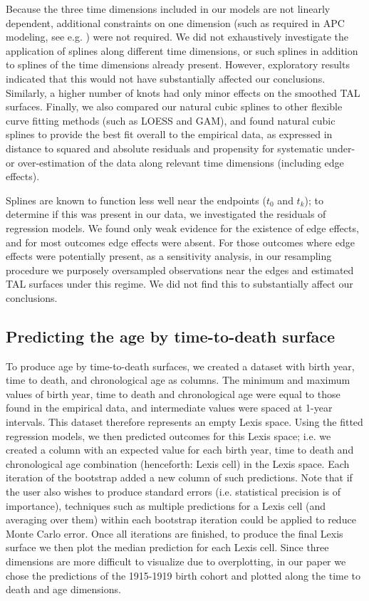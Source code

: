 \documentclass[11pt,oneside,a4paper]{article} %
\begin{document}
\begin{appendices}
Because the three time dimensions included in our models are not linearly
dependent, additional constraints on one dimension (such as required in APC
modeling, see e.g. \citet{clayton1987models}) were not required. We did not exhaustively investigate the application of splines along different time dimensions, or such splines in addition to splines of the time dimensions already present. However, exploratory results indicated that this would not have substantially affected our conclusions. Similarly, a higher number of knots had only minor effects on the smoothed TAL surfaces. Finally, we also compared our natural cubic splines to other flexible curve fitting methods (such as LOESS and GAM), and found natural cubic splines to provide the best fit overall to the empirical data, as expressed in distance to squared and absolute residuals and propensity for systematic under- or over-estimation of the data along relevant time dimensions (including edge effects).

Splines are known to function less well near the endpoints ($t_0$ and $t_k$); to determine if this was present in our data, we investigated the residuals of regression models. We found only weak evidence for the existence of edge effects, and for most outcomes edge effects were absent. For those outcomes where edge effects were potentially present, as a sensitivity analysis, in our resampling procedure we purposely oversampled observations near the edges and estimated TAL surfaces under this regime. We did not find this to substantially affect our conclusions. 

\subsection{Predicting the age by time-to-death surface}
To produce age by time-to-death surfaces, we created a dataset with birth year,
time to death, and chronological age as columns. The minimum and maximum values of birth year, time to death and chronological age were equal to those found in the empirical data, and intermediate values were spaced at 1-year intervals. This dataset therefore represents an empty Lexis space. Using the fitted regression models, we then predicted outcomes for this Lexis space; i.e. we created a column with an expected value for each birth year, time to death and chronological age combination (henceforth: Lexis cell) in the Lexis space. Each iteration of the bootstrap added a new column of such predictions. Note that if the user also wishes to produce standard errors (i.e. statistical precision is of importance), techniques such as multiple predictions for a Lexis cell (and averaging over them) within each bootstrap iteration could be applied to reduce Monte Carlo error. Once all iterations are finished, to produce the final Lexis surface we then plot the median prediction for each Lexis cell. Since three dimensions are more difficult to visualize due to overplotting, in our paper we chose the predictions of the 1915-1919 birth cohort and plotted along the time to death and age dimensions.


\end{appendices}
\end{document}
